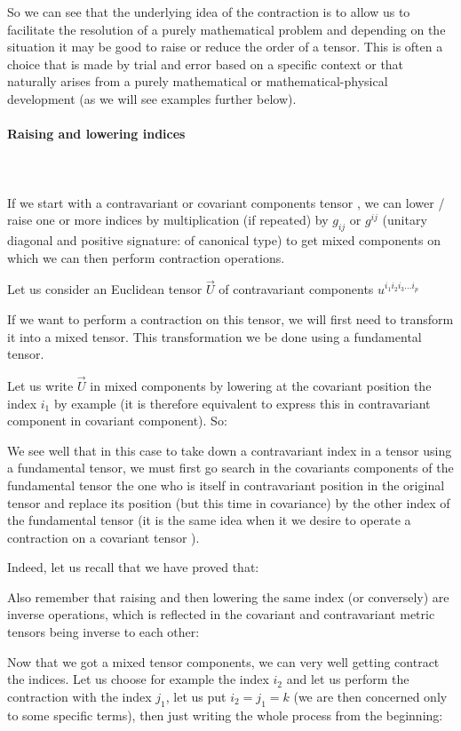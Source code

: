 	So we can see that the underlying idea of the contraction is to allow us to facilitate the resolution of a purely mathematical problem and depending on the situation it may be good  to raise or reduce the order of a tensor. This is often a choice that is made by trial and error based on a specific context or that naturally arises from a purely mathematical or mathematical-physical development (as we will see examples further below).

	\paragraph{Raising and lowering indices}\mbox{}\\\\
	If we start with a contravariant or covariant components tensor , we can lower / raise one or more indices by multiplication (if repeated) by $g_{ij}$ or $g^{ij}$ (unitary diagonal and positive signature: of canonical type) to get mixed components on which we can then perform contraction operations.
	
	Let us consider an Euclidean tensor $\vec{U}$ of contravariant components $u^{i_1i_2i_3\ldots i_p}$

	If we want to perform a contraction on this tensor, we will first need to transform it into a mixed tensor. This transformation we be done using a fundamental tensor.

	Let us write $\vec{U}$ in mixed components by lowering at the covariant position the index $i_1$ by example (it is therefore equivalent to express this in contravariant component in covariant component). So:
	
	We see well that in this case to take down a contravariant index in a tensor using a fundamental tensor, we must first go search in the covariants components of the fundamental tensor the one who is itself in contravariant position in the original tensor and replace its position (but this time in covariance) by the other index of the fundamental tensor (it is the same idea when it we desire to operate a contraction on a covariant tensor ).
	
	Indeed, let us recall that we have proved that:
	
	Also remember that raising and then lowering the same index (or conversely) are inverse operations, which is reflected in the covariant and contravariant metric tensors being inverse to each other:
	
	Now that we got a mixed tensor components, we can very well getting contract the indices. Let us choose for example the index $i_2$ and let us perform the contraction with the index $j_1$, let us put $i_2=j_1=k$ (we are then concerned only to some specific terms), then just writing the whole process from the beginning:
	
